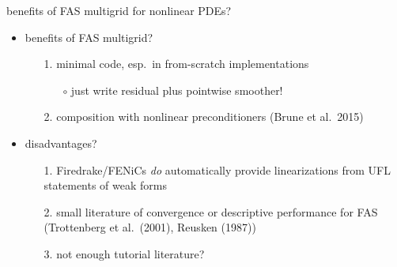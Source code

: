 \documentclass[svgnames,
               hyperref={colorlinks,citecolor=DeepPink4,linkcolor=FireBrick,urlcolor=Maroon},
               usepdftitle=false]  %
               {beamer}
\begin{document}
\begin{frame}{benefits of FAS multigrid for nonlinear PDEs?}

\begin{itemize}
\item \alert{benefits} of FAS multigrid?
    \begin{enumerate}
    \item[1.] minimal code, esp.~in from-scratch implementations
        \begin{itemize}
        \item[$\circ$] just write residual plus pointwise smoother!
        \end{itemize}
    \item[2.] composition with nonlinear preconditioners (Brune et al.~2015)
    \end{enumerate}

\bigskip
\item \alert{disadvantages?}
    \begin{enumerate}
    \item[1.] Firedrake/FENiCs \emph{do} automatically provide linearizations from UFL statements of weak forms
    \item[2.] small literature of convergence or descriptive performance for FAS (Trottenberg et al.~(2001), Reusken (1987))
    \item[3.] not enough tutorial literature?
    \end{enumerate}
\end{itemize}
\end{frame}
\end{document}
